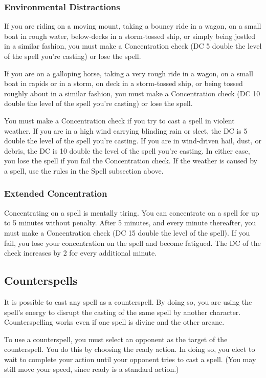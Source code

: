 \subsubsection{Environmental Distractions}

 If you are riding on a moving mount, taking a bouncy ride in a wagon, on a small boat in rough water, below-decks in a storm-tossed ship, or simply being jostled in a similar fashion, you must make a Concentration check (DC 5 \add double the level of the spell you're casting) or lose the spell.

 If you are on a galloping horse, taking a very rough ride in a wagon, on a small boat in rapids or in a storm, on deck in a storm-tossed ship, or being tossed roughly about in a similar fashion, you must make a Concentration check (DC 10 \add double the level of the spell you're casting) or lose the spell.

 You must make a Concentration check if you try to cast a spell in violent weather. If you are in a high wind carrying blinding rain or sleet, the DC is 5 \add double the level of the spell you're casting. If you are in wind-driven hail, dust, or debris, the DC is 10 \add double the level of the spell you're casting. In either case, you lose the spell if you fail the Concentration check. If the weather is caused by a spell, use the rules in the Spell subsection above.

\subsubsection{Extended Concentration}
Concentrating on a spell is mentally tiring. You can concentrate on a spell for up to 5 minutes without penalty. After 5 minutes, and every minute thereafter, you must make a Concentration check (DC 15 \add double the level of the spell). If you fail, you lose your concentration on the spell and become fatigued. The DC of the check increases by 2 for every additional minute.

\subsection{Counterspells}
It is possible to cast any spell as a counterspell. By doing so, you are using the spell's energy to disrupt the casting of the same spell by another character. Counterspelling works even if one spell is divine and the other arcane.

 To use a counterspell, you must select an opponent as the target of the counterspell. You do this by choosing the ready action. In doing so, you elect to wait to complete your action until your opponent tries to cast a spell. (You may still move your speed, since ready is a standard action.)

